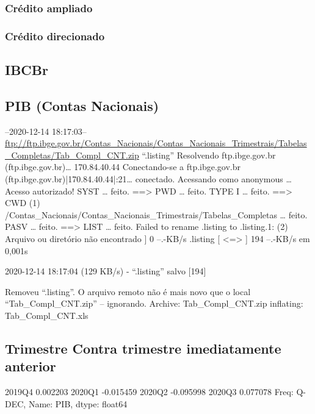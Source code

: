\documentclass{SelfArx}
\begin{document}
\subsubsection*{Crédito ampliado}
\label{sec:org7301afb}

\subsubsection*{Crédito direcionado}
\label{sec:org1d0742d}



\subsection*{IBCBr}
\label{sec:org0a61ef9}

\subsection*{PIB (Contas Nacionais)}
\label{sec:org8740475}

--2020-12-14 18:17:03--  \url{ftp://ftp.ibge.gov.br/Contas\_Nacionais/Contas\_Nacionais\_Trimestrais/Tabelas\_Completas/Tab\_Compl\_CNT.zip}
“.listing”
Resolvendo ftp.ibge.gov.br (ftp.ibge.gov.br)\ldots{} 170.84.40.44
Conectando-se a ftp.ibge.gov.br (ftp.ibge.gov.br)|170.84.40.44|:21\ldots{} conectado.
Acessando como anonymous \ldots{} Acesso autorizado!
SYST \ldots{} feito.    ==> PWD \ldots{} feito.
TYPE I \ldots{} feito.  ==> CWD (1) /Contas\_Nacionais/Contas\_Nacionais\_Trimestrais/Tabelas\_Completas \ldots{} feito.
PASV \ldots{} feito.    ==> LIST \ldots{} feito.
Failed to rename .listing to .listing.1: (2) Arquivo ou diretório não encontrado
]       0  --.-KB/s               
.listing                [ <=>                ]     194  --.-KB/s    em 0,001s

2020-12-14 18:17:04 (129 KB/s) - “.listing” salvo [194]

Removeu “.listing”.
O arquivo remoto não é mais novo que o local “Tab\_Compl\_CNT.zip” -- ignorando.
Archive:  Tab\_Compl\_CNT.zip
  inflating: Tab\_Compl\_CNT.xls

\subsection*{Trimestre Contra trimestre imediatamente anterior}
\label{sec:orgf49a8b3}

2019Q4    0.002203
2020Q1   -0.015459
2020Q2   -0.095998
2020Q3    0.077078
Freq: Q-DEC, Name: PIB, dtype: float64
\end{document}
